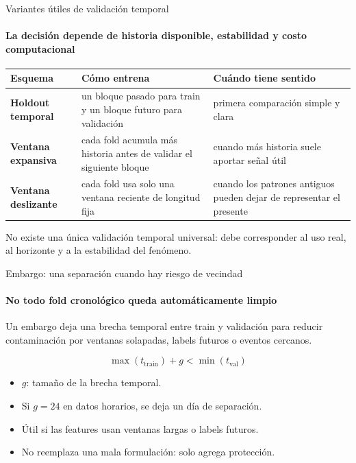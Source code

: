 \documentclass[aspectratio=169,11pt]{beamer}  %
\newcommand{\hrow}{\rowcolor{mlcream}}
\newcommand{\Lg}{\fontsize{16}{20}\selectfont}
\newcommand{\bigstate}[1]{\begin{center}\Lg #1\end{center}}
\begin{document}
\begin{frame}{Variantes útiles de validación temporal}
\framesubtitle{La decisión depende de historia disponible, estabilidad y costo computacional}
\centering
\begin{tabular}{@{}l P{0.33\textwidth} P{0.33\textwidth}@{}}
\toprule
\hrow \textbf{Esquema} & Cómo entrena & Cuándo tiene sentido\\
\midrule
\textbf{Holdout temporal} & un bloque pasado para train y un bloque futuro para validación & primera comparación simple y clara\\
\textbf{Ventana expansiva} & cada fold acumula más historia antes de validar el siguiente bloque & cuando más historia suele aportar señal útil\\
\textbf{Ventana deslizante} & cada fold usa solo una ventana reciente de longitud fija & cuando los patrones antiguos pueden dejar de representar el presente\\
\bottomrule
\end{tabular}

\vspace{0.4em}
No existe una única validación temporal universal: debe corresponder al uso real, al horizonte y a la estabilidad del fenómeno.
\end{frame}

\begin{frame}{Embargo: una separación cuando hay riesgo de vecindad}
\framesubtitle{No todo fold cronológico queda automáticamente limpio}
\bigstate{Un embargo deja una brecha temporal entre train y validación para reducir contaminación por ventanas solapadas, labels futuros o eventos cercanos.}
{\Large\[ \max(t_{\mathrm{train}}) + g < \min(t_{\mathrm{val}}) \]}
\begin{itemize}\small
\item $g$: tamaño de la brecha temporal.
\item Si $g = 24$ en datos horarios, se deja un día de separación.
\item Útil si las features usan ventanas largas o labels futuros.
\item No reemplaza una mala formulación: solo agrega protección.
\end{itemize}
\end{frame}
\end{document}
